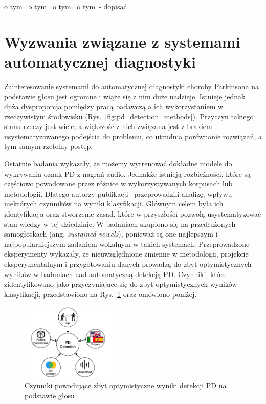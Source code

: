 o tym~\cite{Wodzinski}
o tym~\cite{KARAMAN2021115013}
o tym~\cite{app11073043}
o tym~\cite{bioengineering10050531}- dopisać

\section{Wyzwania związane z systemami automatycznej diagnostyki}\label{sec:wyzwania}

Zainteresowanie systemami do automatycznej diagnostyki choroby Parkinsona na podstawie głosu jest ogromne i wiąże się z nim duże nadzieje.
Istnieje jednak duża dysproporcja pomiędzy pracą badawczą a ich wykorzystaniem w rzeczywistym środowisku (Rys.~\ref{fig:pd_detection_methods}).
Przyczyn takiego stanu rzeczy jest wiele, a większość z nich związana jest z brakiem usystematyzowanego podejścia do problemu, co utrudnia porównanie
rozwiązań, a tym samym rzetelny postęp.

Ostatnie badania wykazały, że możemy wytrenować dokładne modele do wykrywania oznak PD z nagrań audio.
Jednakże istnieją rozbieżności, które są częściowo powodowane przez różnice w
wykorzystywanych korpusach lub metodologii.
Dlatego autorzy publikacji~\cite{SustainedVowelsProblems} przeprowadzili analizę, wpływu niektórych czynników na wyniki klasyfikacji.
Głównym celem była ich identyfikacja oraz stworzenie zasad, które w przyszłości pozwolą usystematyzować stan wiedzy w tej dziedzinie.
W badaniach skupiono się na przedłużonych samogłoskach (ang. \emph{sustained vowels}), ponieważ są one najlepszym i najpopularniejszym zadaniem
wokalnym w takich systemach.
Przeprowadzone eksperymenty wykazały, że nieuwzględnione zmienne w metodologii, projekcie eksperymentalnym i
przygotowaniu danych prowadzą do zbyt optymistycznych wyników w badaniach nad automatyczną detekcją PD\@.
Czynniki, które zidentyfikowano jako przyczyniające się do zbyt optymistycznych wyników klasyfikacji, przedstawiono na Rys.~\ref{fig:factors_PD_detection} oraz omówiono poniżej.


\begin{figure}[htbp]
	\centering
	\includegraphics[width=0.4\textwidth]{./img/influence_of_factors_on_PD_detection}
	\caption{Czynniki powodujące zbyt optymistyczne wyniki detekcji PD na podstawie głosu \cite {SustainedVowelsProblems}}
    \label{fig:factors_PD_detection}
\end{figure}



